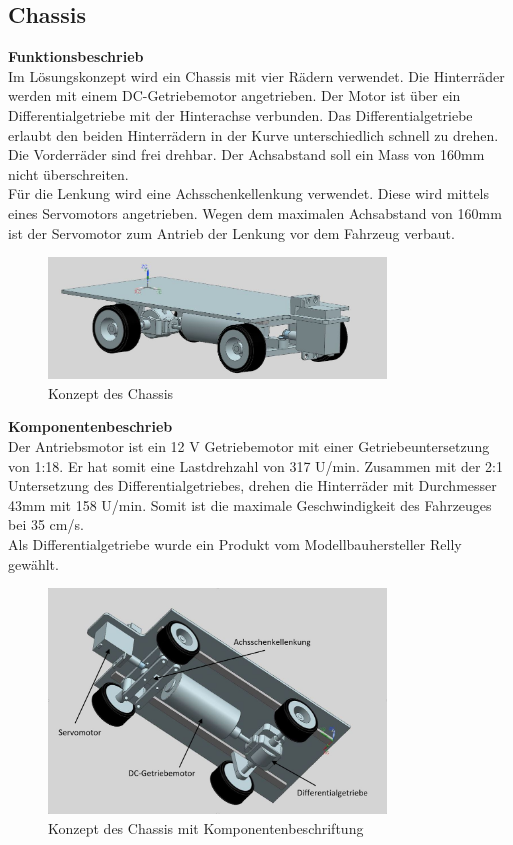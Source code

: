 \newpage
\subsection{Chassis}
\textbf{Funktionsbeschrieb}\\[0.2cm]
Im Lösungskonzept wird ein Chassis mit vier Rädern verwendet. Die Hinterräder werden mit einem DC-Getriebemotor angetrieben. Der Motor ist über ein Differentialgetriebe mit der Hinterachse verbunden. Das Differentialgetriebe erlaubt den beiden Hinterrädern in der Kurve unterschiedlich schnell zu drehen. Die Vorderräder sind frei drehbar. Der Achsabstand soll ein Mass von 160mm nicht überschreiten.\\
Für die Lenkung wird eine Achsschenkellenkung verwendet. Diese wird mittels eines Servomotors angetrieben. Wegen dem maximalen Achsabstand von 160mm ist der Servomotor zum Antrieb der Lenkung vor dem Fahrzeug verbaut.
\begin{figure}[H]%
\centering
\includegraphics[width=0.8\textwidth]{03_Loesungskonzept/pictures/Chassis_2.JPG}
\caption{Konzept des Chassis}
\label{fig:activityRoute}
\end{figure}
\textbf{Komponentenbeschrieb}\\[0.2cm]
Der Antriebsmotor ist ein 12 V Getriebemotor mit einer Getriebeuntersetzung von 1:18. Er hat somit eine Lastdrehzahl von 317 U/min. Zusammen mit der 2:1 Untersetzung des Differentialgetriebes, drehen die Hinterräder mit Durchmesser 43mm mit 158 U/min. Somit ist die maximale Geschwindigkeit des Fahrzeuges bei 35 cm/s.\\
Als Differentialgetriebe wurde ein Produkt vom Modellbauhersteller Relly gewählt.
\begin{figure}[H]%
\centering
\includegraphics[width=0.8\textwidth]{03_Loesungskonzept/pictures/Chassis_1.JPG}
\caption{Konzept des Chassis mit Komponentenbeschriftung}
\label{fig:activityRoute}
\end{figure}
